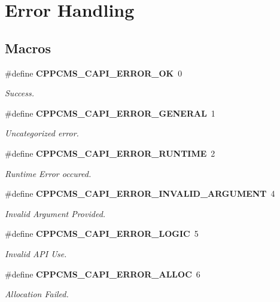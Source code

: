\section{Error Handling}
\label{group__capi__session__error__handling}
\subsection*{Macros}
\begin{DoxyCompactItemize}
\item 
\#define {\bf C\+P\+P\+C\+M\+S\+\_\+\+C\+A\+P\+I\+\_\+\+E\+R\+R\+O\+R\+\_\+\+OK}~0\label{group__capi__session__error__handling_ga68ddb6716d6d2ceda3288f999a8c285d}

\begin{DoxyCompactList}\small\item\em Success. \end{DoxyCompactList}\item 
\#define {\bf C\+P\+P\+C\+M\+S\+\_\+\+C\+A\+P\+I\+\_\+\+E\+R\+R\+O\+R\+\_\+\+G\+E\+N\+E\+R\+AL}~1\label{group__capi__session__error__handling_ga97830c2a5f362eba9b54f87e835d859d}

\begin{DoxyCompactList}\small\item\em Uncategorized error. \end{DoxyCompactList}\item 
\#define {\bf C\+P\+P\+C\+M\+S\+\_\+\+C\+A\+P\+I\+\_\+\+E\+R\+R\+O\+R\+\_\+\+R\+U\+N\+T\+I\+ME}~2\label{group__capi__session__error__handling_ga60be3bd462bf3c0bd0b4305af0d7b0d1}

\begin{DoxyCompactList}\small\item\em Runtime Error occured. \end{DoxyCompactList}\item 
\#define {\bf C\+P\+P\+C\+M\+S\+\_\+\+C\+A\+P\+I\+\_\+\+E\+R\+R\+O\+R\+\_\+\+I\+N\+V\+A\+L\+I\+D\+\_\+\+A\+R\+G\+U\+M\+E\+NT}~4\label{group__capi__session__error__handling_ga5e1316d42684d2a808dfc3b29fa0dabf}

\begin{DoxyCompactList}\small\item\em Invalid Argument Provided. \end{DoxyCompactList}\item 
\#define {\bf C\+P\+P\+C\+M\+S\+\_\+\+C\+A\+P\+I\+\_\+\+E\+R\+R\+O\+R\+\_\+\+L\+O\+G\+IC}~5\label{group__capi__session__error__handling_gac39130f6a035459230547b0e815c2cc7}

\begin{DoxyCompactList}\small\item\em Invalid A\+PI Use. \end{DoxyCompactList}\item 
\#define {\bf C\+P\+P\+C\+M\+S\+\_\+\+C\+A\+P\+I\+\_\+\+E\+R\+R\+O\+R\+\_\+\+A\+L\+L\+OC}~6\label{group__capi__session__error__handling_ga40bb65ebff8f9f60f505932b4bb467d4}

\begin{DoxyCompactList}\small\item\em Allocation Failed. \end{DoxyCompactList}\end{DoxyCompactItemize}
